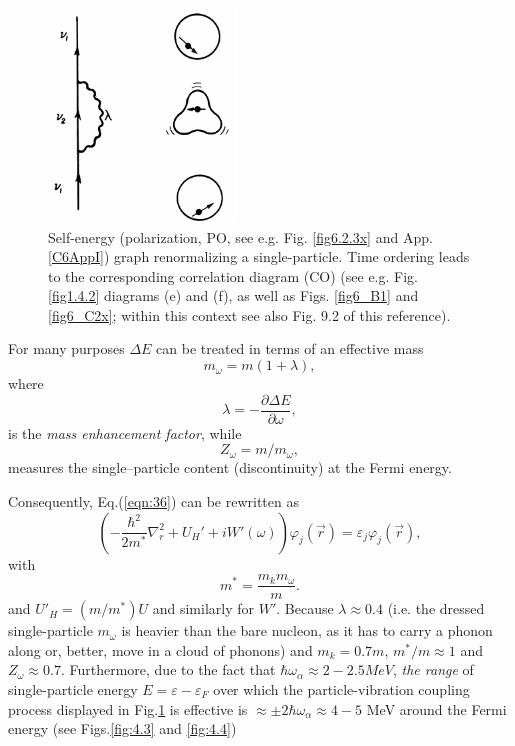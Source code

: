 \begin{figure}[h!]
\centerline {
\includegraphics*[width=5cm]{introduccion/figs/figintroD2}
}
\caption{Self-energy (polarization, PO, see e.g. Fig. \ref{fig6.2.3x} and App. \ref{C6AppI}) graph renormalizing  a single-particle. Time ordering leads to the corresponding correlation diagram (CO) (see e.g. Fig. \ref{fig1.4.2} diagrams (e) and (f), as well as Figs. \ref{fig6_B1} and \ref{fig6_C2x}; within this context see also \cite{Brink:05} Fig. 9.2 of this reference).}
\label{fig:4.2}
\end{figure}
For many purposes $\Delta E$ can be treated in terms of an effective mass
\begin{equation}
m_{\omega} = m(1+\lambda),
\label{eqn:38}
\end{equation}
where
\begin{equation}
\lambda= - \frac{\partial \Delta E}{\partial \omega},
\label{eqn:39}
\end{equation}
is the {\it mass enhancement factor}, while
\begin{equation}
\nonumber
Z_{\omega}=m/m_{\omega},
\end{equation}
measures the single--particle content (discontinuity) at the Fermi energy.

Consequently, Eq.(\ref{eqn:36}) can be rewritten as
\begin{equation}
\left( - \frac{\hbar^2}{2m^*} \nabla_r^2 + U_H' + i W'(\omega) \right) \varphi_j(\vec{r}) = \varepsilon_j \varphi_j(\vec{r}),
\label{eqn:40a}
\end{equation}
with
\begin{equation}
m^* = \frac{m_k m_{\omega}}{m} .
\label{eqn:40b}
\end{equation}
 and $U'_H = (m/m^*) U$ and similarly for $W'$. Because $\lambda \approx 0.4$ (i.e. the dressed single-particle $m_{\omega}$ is heavier than the bare nucleon, as it has to carry a phonon along or, better, move in a cloud of phonons) and $m_k=0.7m$, $m^*/m \approx 1$ and $Z_{\omega} \approx 0.7$. Furthermore, due to the fact that $\hbar \omega_{\alpha} \approx 2-2.5 MeV$, {\it the range} of single-particle energy $E=\varepsilon-\varepsilon_F$ over which the particle-vibration coupling process displayed in Fig.\ref{fig:4.2} is effective is $\approx \pm 2\hbar \omega_{\alpha} \approx 4-5$ MeV around the Fermi energy (see Figs.\ref{fig:4.3} and \ref{fig:4.4})

